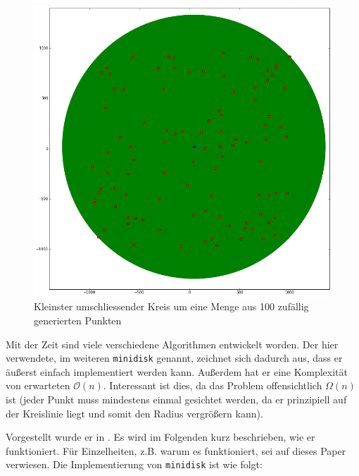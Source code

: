 \documentclass{article}
\begin{document}
\begin{figure}[!ht]
  \centering
  \includegraphics[width=.9\textwidth]{img/kuk_100.png}
  \caption{Kleinster umschliessender Kreis um eine Menge aus 100 zufällig generierten Punkten}
  \label{img:kuk_100}
\end{figure}

Mit der Zeit sind viele verschiedene Algorithmen entwickelt worden. Der hier verwendete, im weiteren \texttt{minidisk} genannt,
zeichnet sich dadurch aus, dass er äußerst einfach implementiert werden kann. Außerdem hat er eine Komplexität von erwarteten 
$\mathcal O(n)$. Interessant ist dies, da das Problem offensichtlich $\Omega (n)$ ist (jeder Punkt muss mindestens einmal 
gesichtet werden, da er prinzipiell auf der Kreislinie liegt und somit den Radius vergrößern kann).

Vorgestellt wurde er in \cite{welzl91}. Es wird im Folgenden kurz beschrieben, wie er funktioniert. Für Einzelheiten, z.B. 
warum es funktioniert, sei auf dieses Paper verwiesen. Die Implementierung von \texttt{minidisk} ist wie folgt:
\end{document}
